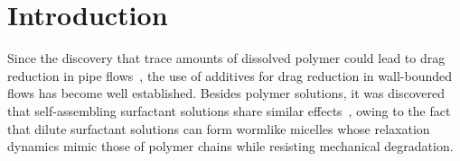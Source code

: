 \documentclass[aps,prfluids,groupedaddress,showkeys,11pt,tightenlines]{revtex4-2}
\begin{document}

\maketitle

\section{Introduction\label{sec:Intro}}

Since the discovery that trace amounts of dissolved polymer could lead to drag reduction in pipe flows~\cite{toms1948}, the use of additives for drag reduction in wall-bounded flows has become well established. Besides polymer solutions, it was discovered that self-assembling surfactant solutions share similar effects~\cite{lumley1969}, owing to the fact that dilute surfactant solutions can form wormlike micelles whose relaxation dynamics mimic those of polymer chains while resisting mechanical degradation.
\end{document}
